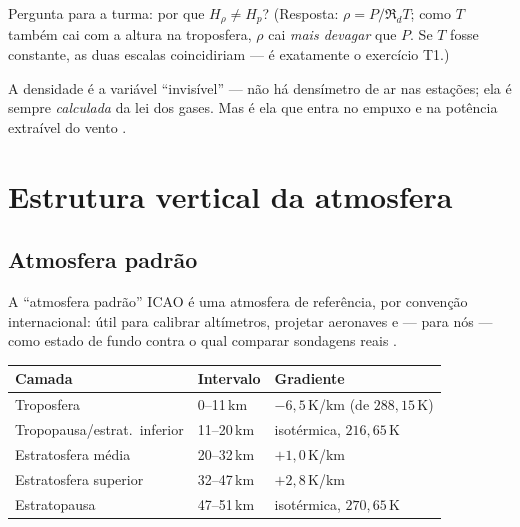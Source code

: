 \documentclass[11pt]{article}
\begin{document}
Pergunta para a turma: por que $H_\rho \neq H_p$? (Resposta: $\rho=P/\Re_d T$;
como $T$ também cai com a altura na troposfera, $\rho$ cai \emph{mais devagar}
que $P$. Se $T$ fosse constante, as duas escalas coincidiriam — é exatamente
o exercício T1.)

A densidade é a variável ``invisível'' — não há densímetro de ar nas
estações; ela é sempre \emph{calculada} da lei dos gases. Mas é ela que entra
no empuxo  e na potência extraível
do vento .

\section{Estrutura vertical da atmosfera}\label{sec:estrutura}

\subsection{Atmosfera padrão}



A ``atmosfera padrão'' ICAO é uma atmosfera de referência, por convenção
internacional: útil para calibrar altímetros, projetar aeronaves e — para
nós — como estado de fundo contra o qual comparar sondagens reais
.

\begin{noquadro}
\begin{tabular}{lll}
Camada & Intervalo & Gradiente \\
\hline
Troposfera & 0--11\,km & $-6{,}5$\,K/km (de $288{,}15$\,K) \\
Tropopausa/estrat.\ inferior & 11--20\,km & isotérmica, $216{,}65$\,K \\
Estratosfera média & 20--32\,km & $+1{,}0$\,K/km \\
Estratosfera superior & 32--47\,km & $+2{,}8$\,K/km \\
Estratopausa & 47--51\,km & isotérmica, $270{,}65$\,K \\
\end{tabular}
\end{noquadro}
\end{document}

